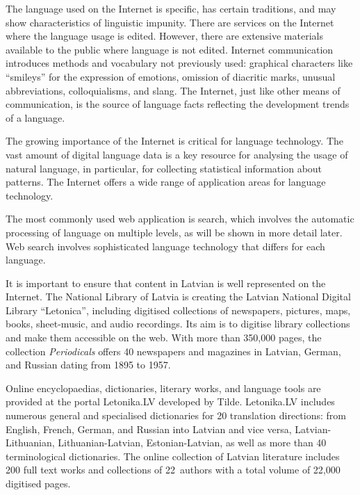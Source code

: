 \begin{multicols}{2}
The language used on the Internet is specific, has certain traditions, and may show characteristics of linguistic impunity.
There are services on the Internet where the language usage is edited.
However, there are extensive materials available to the public where language is not edited.
Internet communication introduces methods and vocabulary not previously used: graphical characters like ``smileys'' for the expression of emotions, omission of diacritic marks, unusual abbreviations, colloquialisms, and slang.
The Internet, just like other means of communication, is the source of language facts reflecting the development trends of a language.

The growing importance of the Internet is critical for language technology.
The vast amount of digital language data is a key resource for analysing the usage of natural language, in particular, for collecting statistical information about patterns.
The Internet offers a wide range of application areas for language technology.

The most commonly used web application is search, which involves the automatic processing of language on multiple levels, as will be shown in more detail later.
Web search involves sophisticated language technology that differs for each language.

It is important to ensure that content in Latvian is well represented on the Internet.
The National Library of Latvia is creating the Latvian National Digital Library ``Letonica'', including digitised collections of newspapers, pictures, maps, books, sheet-music, and audio recordings.
Its aim is to digitise library collections and make them accessible on the web.
With more than 350,000 pages, the collection \textit{Periodicals} \cite{Meta6} offers 40 newspapers and magazines in Latvian, German, and Russian dating from 1895 to 1957.

Online encyclopaedias, dictionaries, literary works, and language tools are provided at the portal Letonika.LV developed by Tilde.
Letonika.LV includes numerous general and specialised dictionaries for 20 translation directions: from English, French, German, and Russian into Latvian and vice versa, Latvian-Lithuanian, Lithuanian-Latvian, Estonian-Latvian, as well as more than 40 terminological dictionaries.
The online collection of Latvian literature includes 200 full text works and collections of 22~authors with a total volume of 22,000 digitised pages.


\end{multicols}
